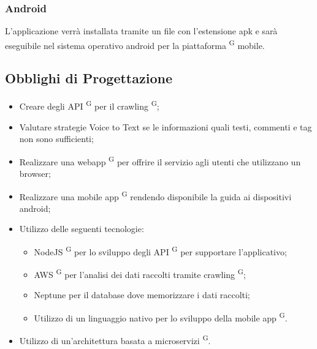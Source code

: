 \subsubsection{Android}
L'applicazione verrà installata tramite un file con l’estensione apk e sarà eseguibile nel sistema operativo android per la piattaforma \textsuperscript{G} mobile.

\subsection{Obblighi di Progettazione}
\begin{itemize}
  \item Creare degli API \textsuperscript{G} per il crawling \textsuperscript{G};
  \item Valutare strategie Voice to Text se le informazioni quali testi, commenti e tag non sono sufficienti;
  \item Realizzare una webapp \textsuperscript{G} per offrire il servizio agli utenti che utilizzano un browser;
  \item Realizzare una mobile app \textsuperscript{G} rendendo disponibile la guida ai dispositivi android;
  \item Utilizzo delle seguenti tecnologie: 
  \begin{itemize}
    \item NodeJS \textsuperscript{G} per lo sviluppo degli API \textsuperscript{G} per supportare l’applicativo;
    \item AWS \textsuperscript{G} per l'analisi dei dati raccolti tramite crawling \textsuperscript{G};
    \item Neptune per il database dove memorizzare i dati raccolti;
    \item Utilizzo di un linguaggio nativo per lo sviluppo della mobile app \textsuperscript{G}.
  \end{itemize}
  \item Utilizzo di un'architettura basata a microservizi \textsuperscript{G}.

\end{itemize}